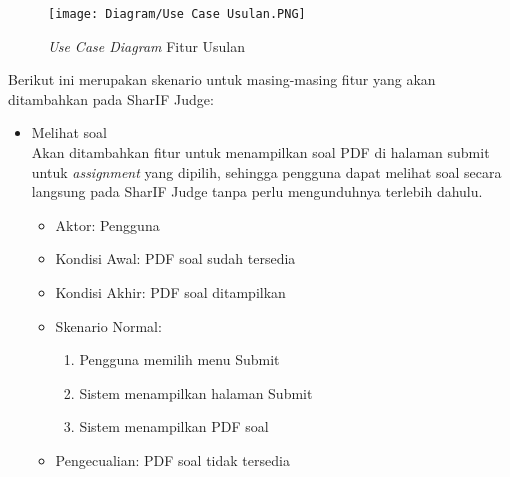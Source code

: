     \begin{figure}[H]
    	\centering  
    	\texttt{[image: Diagram/Use Case Usulan.PNG]}  
    	\caption{\textit{Use Case Diagram} Fitur Usulan}
    	\label{fig:3:usecase} 
    \end{figure} 

Berikut ini merupakan skenario untuk masing-masing fitur yang akan ditambahkan pada SharIF Judge:

\begin{itemize}

    \item Melihat soal \\ Akan ditambahkan fitur untuk menampilkan soal PDF di halaman submit untuk \textit{assignment} yang dipilih, sehingga pengguna dapat melihat soal secara langsung pada SharIF Judge tanpa perlu mengunduhnya terlebih dahulu.
        \begin{itemize}
            \item Aktor: Pengguna
            \item Kondisi Awal: PDF soal sudah tersedia
            \item Kondisi Akhir: PDF soal ditampilkan
            \item Skenario Normal:
                \begin{enumerate}
                    \item Pengguna memilih menu Submit
                    \item Sistem menampilkan halaman Submit
                    \item Sistem menampilkan PDF soal
                \end{enumerate}
            \item Pengecualian: PDF soal tidak tersedia
        \end{itemize}
        

\end{itemize}

